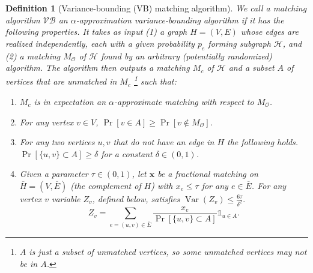 \documentclass[letterpaper,11pt]{article}
\newcommand{\mc}[1]{\ensuremath{\mathcal{#1}}}
\newcommand{\VB}[0]{\ensuremath{\mathcal{VB}}}
\newcommand{\apx}[0]{\ensuremath{\mathcal{\alpha}}}
\DeclareMathOperator{\var}{Var}
\newtheorem{definition}[lemma]{Definition}
\renewcommand{\mc}[1]{\ensuremath{\mathcal{#1}}}
\begin{document}
\begin{definition}[Variance-bounding (VB) matching algorithm]\label{def:variance-bounding} We call a matching algorithm $\VB$ an \apx-approximation variance-bounding algorithm if it has the following properties. It takes as input (1)  a graph $H=(V, E)$ whose edges are realized independently, each with a given probability $p_e$ forming subgraph $\mathcal{H}$,  and (2) a matching $M_{\mc{O}}$ of $\mathcal{H}$ found by an arbitrary (potentially randomized) algorithm. The algorithm then outputs a  matching $M_c$ of $\mathcal{H}$ and a subset $A$ of vertices that are unmatched in  $M_c$ \footnote{$A$ is just a subset of unmatched vertices, so some unmatched vertices may not be in $A$.} such that: \begin{enumerate}[label=$(\roman*)$]

\item $M_c$ is in expectation  an \apx-approximate matching with respect to $M_{\mc{O}}$.\label{viprop:approx}
\item For any vertex $v \in V$, $\Pr[v\in A] \geq \Pr[v \notin M_{\mc{O}}]$. \label{viprop:Asideprob}

\item \label{viprop:independence} For any two vertices $u, v$ that do not have an edge in $H$ the following holds. $\Pr[\{u, v\} \subset A]\geq \delta$ for a constant $\delta\in (0, 1)$.

\item \label{viprop:variance}  Given a parameter $\tau\in (0,1)$, let $\bm{x}$ be a fractional matching on $\overline{H} = (V, \overline{E})$ (the complement of  $H$) with $x_e\leq \tau$ for any $e\in \overline{E}$. 
For  any vertex $v$ variable $Z_v$, defined below, satisfies  $\var(Z_v)\leq \frac{6\tau}{\delta^2}.$ 
$$Z_v = \sum_{e=(u,v)\in \overline{E}}\frac{x_e}{\Pr[\{u,v\}\subset A]}\mathds{1}_{u\in A}.$$ 

\end{enumerate}
\end{definition}
\end{document}
